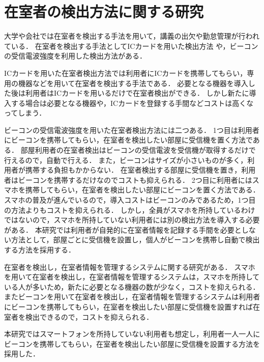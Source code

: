 \section{在室者の検出方法に関する研究}\label{2.2}
大学や会社では在室者を検出する手法を用いて，講義の出欠\cite{smartphone}\cite{nfcandroid}\cite{android}\cite{smartbase}\cite{garake}や勤怠管理\cite{amano}が行われている．
在室者を検出する手法としてICカードを用いた検出方法
\cite{zyugyou}
\cite{felica}
\cite{densi}
\cite{notouchic}
\cite{felicaweb}
\cite{suica}
や，ビーコンの受信電波強度を利用した検出方法\cite{bledakoku}\cite{blesuitei}がある．

ICカードを用いた在室者検出方法では利用者にICカードを携帯してもらい，専用の機器などを用いて在室者を検出する手法である．
必要となる機器を導入した後は利用者はICカードを用いるだけで在室者検出ができる．
しかし新たに導入する場合は必要となる機器や，ICカードを登録する手間などコストは高くなってしまう．

ビーコンの受信電波強度を用いた在室者検出方法には二つある．
1つ目は利用者にビーコンを携帯してもらい，在室者を検出したい部屋に受信機を置く方法である．
部屋利用者の在室者検出はビーコンの受信電波を受信機が取得するだけで行えるので，自動で行える．
また，ビーコンはサイズが小さいものが多く，利用者が携帯する負担もかからない．
在室者検出する部屋に受信機を置き，利用者はビーコンを携帯するだけなのでコストも抑えられる．
2つ目に利用者にはスマホを携帯してもらい，在室者を検出したい部屋にビーコンを置く方法である．
スマホの普及が進んでいる\cite{hukyu}ので，導入コストはビーコンのみであるため，1つ目の方法よりもコストを抑えられる．
しかし，全員がスマホを所持しているわけではないので，スマホを所持していない利用者には別の検出方法を導入する必要がある．
本研究では利用者が自発的に在室者情報を記録する手間を必要としない方法として，部屋ごとに受信機を設置し，個人がビーコンを携帯し自動で検出する方法を採用する．

在室者を検出し，在室者情報を管理するシステムに関する研究がある\cite{smartphoneAndRoom}\cite{laboratory}\cite{prep}．
スマホを用いて在室者を検出し，在室者情報を管理するシステムは，スマホを所持している人が多いため，新たに必要となる機器の数が少なく，コストを抑えられる\cite{smartphoneAndRoom}．
またビーコンを用いて在室者を検出し，在室者情報を管理するシステムは利用者にビーコンを携帯してもらい，在室者を検出したい部屋に受信機を設置すれば在室者を検出できるので，コストを抑えられる\cite{laboratory}\cite{prep}．



本研究ではスマートフォンを所持していない利用者も想定し，利用者一人一人にビーコンを携帯してもらい，在室者を検出したい部屋に受信機を設置する方法を採用した．
